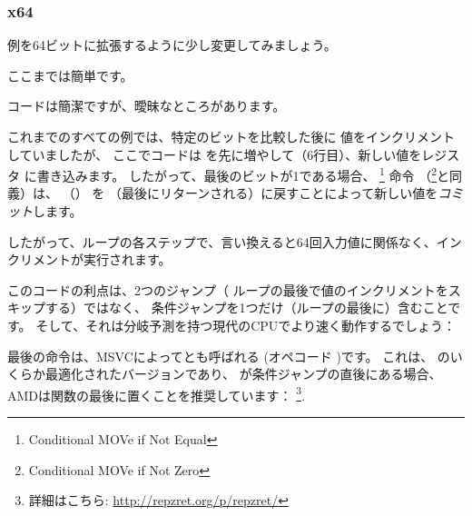 ﻿\subsubsection{x64}
\label{subsec:popcnt}

例を64ビットに拡張するように少し変更してみましょう。




ここまでは簡単です。






コードは簡潔ですが、曖昧なところがあります。

これまでのすべての例では、特定のビットを比較した後に 値をインクリメントしていましたが、
ここでコードは を先に増やして（6行目）、新しい値をレジスタ \EDX に書き込みます。
したがって、最後のビットが1である場合、 \CMOVNE\footnote{Conditional MOVe if Not Equal} 命令
（\CMOVNZ\footnote{Conditional MOVe if Not Zero}と同義）は、 \EDX （）
を \EAX （最後にリターンされる）に戻すことによって新しい値を\emph{コミット}します。

したがって、ループの各ステップで、言い換えると64回入力値に関係なく、インクリメントが実行されます。

このコードの利点は、2つのジャンプ（ ループの最後で値のインクリメントをスキップする）ではなく、
条件ジャンプを1つだけ（ループの最後に）含むことです。
そして、それは分岐予測を持つ現代のCPUでより速く動作するでしょう：

\label{FATRET}
最後の命令は、MSVCによってとも呼ばれる
 (オペコード )です。
これは、 \RET のいくらか最適化されたバージョンであり、
\RET が条件ジャンプの直後にある場合、AMDは関数の最後に置くことを推奨しています：
\footnote{詳細はこちら: \url{http://repzret.org/p/repzret/}}.




